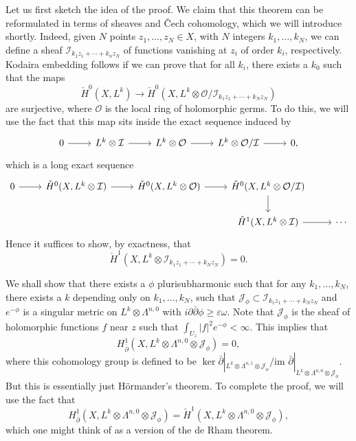 \documentclass{../mathnotes}
\begin{document}
Let us first sketch the idea of the proof. We claim that this theorem can be reformulated
in terms of sheaves and \v{C}ech cohomology, which we will introduce shortly. Indeed, given $N$ points $z_1,\ldots, z_N\in X$,
with $N$ integers $k_1,\ldots, k_N$, we can define a sheaf $\mathcal{I}_{k_1z_1+\cdots+k_nz_N}$ of functions
vanishing at $z_i$ of order $k_i$, respectively.
Kodaira embedding follows if we can prove that for all $k_i$, there exists a $k_0$ such that the maps
\[\check{H}^0(X,L^k)\to\check{H}^0(X,L^k\otimes\mathcal{O}/\mathcal{I}_{k_1z_1+\cdots+k_Nz_N})\]
are surjective, where $\mathcal{O}$ is the local ring of holomorphic germs. To do this, we will use the fact
that this map sits inside the exact sequence induced by
\begin{equation*}
    \begin{tikzcd}
        0\arrow{r}&L^k\otimes\mathcal{I}\arrow{r}&L^k\otimes\mathcal{O}\arrow{r}&L^k\otimes\mathcal{O}/\mathcal{I}\arrow{r}&0,
    \end{tikzcd}
\end{equation*}
which is a long exact sequence
\begin{equation*}
    \begin{tikzcd}
        0\arrow{r}&\check H^0(X,L^k\otimes\mathcal{I})\arrow{r}&\check H^0(X,L^k\otimes \mathcal{O})\arrow{r}&\check H^0(X,L^k\otimes\mathcal{O}/\mathcal{I})\arrow{d}&\\
        &&&\check H^1(X,L^k\otimes \mathcal{I})\arrow{r}&\cdots
    \end{tikzcd}
\end{equation*}
Hence it suffices to show, by exactness, that
\[\check H^1(X,L^k\otimes\mathcal{I}_{k_1z_1+\cdots+k_Nz_N})=0.\]

We shall show that there exists a $\phi$ plurisubharmonic such that for any $k_1,\ldots,k_N$, there exists a $k$ depending
only on $k_1,\ldots,k_N$, such that $\mathcal{J}_{\phi}\subset\mathcal{I}_{k_1z_1+\cdots+k_Nz_N}$ and $e^{-\phi}$ is a singular
metric on $L^k\otimes\Lambda^{n,0}$ with $i\partial\bar\partial\phi\geq\varepsilon\omega$.
Note that $\mathcal{J}_\phi$ is the sheaf of holomorphic functions $f$ near $z$ such that $\int_{U_z}|f|^2e^{-\phi}<\infty$.
This implies that
\[H^1_{\bar\partial}(X,L^k\otimes\Lambda^{n,0}\otimes\mathcal{J}_\phi)=0,\]
where this cohomology group is defined to be $\ker \bar\partial|_{L^k\otimes\Lambda^{n,1}\otimes\mathcal{J}_\phi}/\text{im }\bar\partial|_{L^k\otimes\Lambda^{n,0}\otimes\mathcal{J}_\phi}$.
But this is essentially just H\"ormander's theorem. To complete the proof, we will use the fact that
\[H^1_{\bar\partial}(X,L^k\otimes \Lambda^{n,0}\otimes\mathcal{J}_\phi)=\check H^1(X,L^k\otimes\Lambda^{n,0}\otimes\mathcal{J}_\phi),\]
which one might think of as a version of the de Rham theorem.
\end{document}
